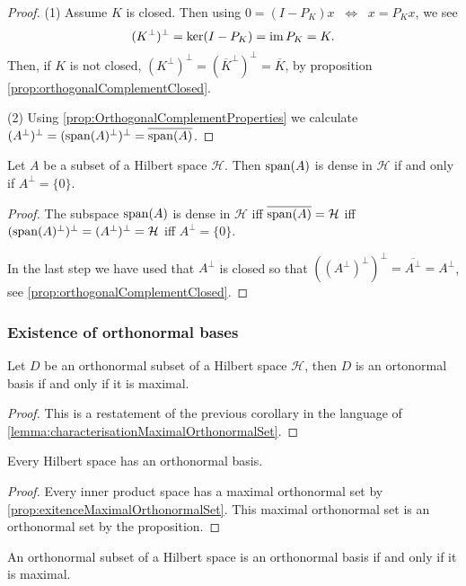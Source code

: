 \begin{proof}
(1) Assume $K$ is closed. Then using $0=(I-P_K)x\;\; \Leftrightarrow \;\; x=P_Kx$, we see
\[ (K^\perp)^\perp = \ker(I-P_K) = \operatorname{im} P_K = K. \]
Then, if $K$ is not closed, $(K^\perp)^\perp = (\overline{K}^\perp)^\perp = \overline{K}$, by proposition \ref{prop:orthogonalComplementClosed}.

(2) Using \ref{prop:OrthogonalComplementProperties} we calculate $(A^\perp)^\perp = (\operatorname{span}(A)^\perp)^\perp = \overline{\operatorname{span}(A)}$.
\end{proof}
\begin{corollary} \label{corollary:denseZeroComplement}
Let $A$ be a subset of a Hilbert space $\mathcal{H}$. Then $\operatorname{span}(A)$ is dense in $\mathcal{H}$ \textup{if and only if} $A^\perp = \{0\}$.
\end{corollary}
\begin{proof}
The subspace $\operatorname{span}(A)$ is dense in $\mathcal{H}$ iff $\overline{\operatorname{span}(A)} = \mathcal{H}$ iff $(\operatorname{span}(A)^\perp)^\perp = (A^\perp)^\perp = \mathcal{H}$ iff $A^\perp = \{0\}$.

In the last step we have used that $A^\perp$ is closed so that $((A^\perp)^\perp)^\perp = \overline{A^\perp} = A^\perp$, see \ref{prop:orthogonalComplementClosed}.
\end{proof}

\subsubsection{Existence of orthonormal bases}
\begin{corollary}
Let $D$ be an orthonormal subset of a Hilbert space $\mathcal{H}$, then $D$ is an ortonormal basis \textup{if and only if} it is maximal.
\end{corollary}
\begin{proof}
This is a restatement of the previous corollary in the language of \ref{lemma:characterisationMaximalOrthonormalSet}.
\end{proof}
\begin{corollary}
Every Hilbert space has an orthonormal basis.
\end{corollary}
\begin{proof}
Every inner product space has a maximal orthonormal set by \ref{prop:exitenceMaximalOrthonormalSet}. This maximal orthonormal set is an orthonormal set by the proposition.
\end{proof}
\begin{corollary} \label{lemma:HilbertOnBasisMaximal}
An orthonormal subset of a Hilbert space is an orthonormal basis \textup{if and only if} it is maximal.
\end{corollary}

